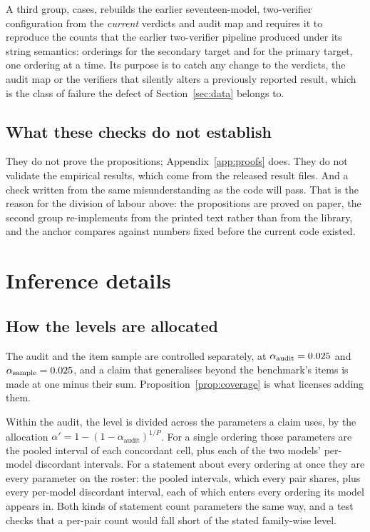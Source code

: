 A third group, \TestsAnchor{} cases, rebuilds the earlier seventeen-model, two-verifier
configuration from the \emph{current} verdicts and audit map and requires it to reproduce the
counts that the earlier two-verifier pipeline produced under its string semantics:
\AnchorStringCombined{} orderings for the secondary target and \AnchorStringAudit{} for the
primary target, one ordering at a time. Its purpose is to catch any change to the verdicts, the
audit map or the verifiers that silently alters a previously reported result, which is the
class of failure the defect of Section~\ref{sec:data} belongs to.

\subsection{What these checks do not establish}

They do not prove the propositions; Appendix~\ref{app:proofs} does. They do not validate the
empirical results, which come from the released result files. And a check written from the same misunderstanding as the code will pass. That is the
reason for the division of labour above: the propositions are proved on paper, the
second group re-implements from the printed text rather than from the library, and
the anchor compares against numbers fixed before the current code existed.

\section{Inference details}
\label{app:inference}

\subsection{How the levels are allocated}

The audit and the item sample are controlled separately, at $\alpha_{\mathrm{audit}} =
0.025$ and $\alpha_{\mathrm{sample}} = 0.025$, and a claim that generalises
beyond the benchmark's items is made at one minus their sum. Proposition~\ref{prop:coverage}
is what licenses adding them.

Within the audit, the level is divided across the parameters a claim uses, by the allocation
$\alpha' = 1 - (1-\alpha_{\mathrm{audit}})^{1/P}$. For a single ordering those parameters are
the pooled interval of each concordant cell, plus each of the two models' per-model
discordant intervals. For a statement about every ordering at once they are every parameter on
the roster: the pooled intervals, which every pair shares, plus every per-model discordant
interval, each of which enters every ordering its model appears in. Both kinds of statement
count parameters the same way, and a test checks that a per-pair count would fall short of the
stated family-wise level.

